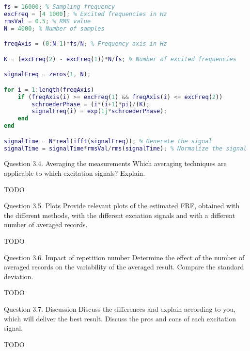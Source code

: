 \begin{lstlisting}[language=Matlab]
fs = 16000; % Sampling frequency
excFreq = [4 1000]; % Excited frequencies in Hz
rmsVal = 0.5; % RMS value
N = 4000; % Number of samples

freqAxis = (0:N-1)*fs/N; % Frequency axis in Hz

K = (excFreq(2) - excFreq(1))*N/fs; % Number of excited frequencies

signalFreq = zeros(1, N);

for i = 1:length(freqAxis)
    if (freqAxis(i) >= excFreq(1) && freqAxis(i) <= excFreq(2))
        schroederPhase = (i*(i+1)*pi)/(K);
        signalFreq(i) = exp(1j*schroederPhase);
    end
end

signalTime = N*real(ifft(signalFreq)); % Generate the signal
signalTime = signalTime*rmsVal/rms(signalTime); % Normalize the signal
\end{lstlisting}


\begin{Task}{Question 3.4. Averaging the measurements}
    Which averaging techniques are applicable to which excitation signals? Explain.
\end{Task}

\huge{TODO}
\normalsize

\begin{Task}{Question 3.5. Plots}
    Provide relevant plots of the estimated FRF, obtained with the different methods, with the different exciation signals and with a different number of averaged records.
\end{Task}

\huge{TODO}
\normalsize

\begin{Task}{Question 3.6. Impact of repetition number}
    Determine the effect of the number of averaged records on the variability of the averaged result. Compare the standard deviation.
\end{Task}

\huge{TODO}
\normalsize

\begin{Task}{Question 3.7. Discussion}
    Discuss the differences and explain according to you, which will deliver the best result. Discuss the pros and cons of each excitation signal.
\end{Task}

\huge{TODO}
\normalsize
